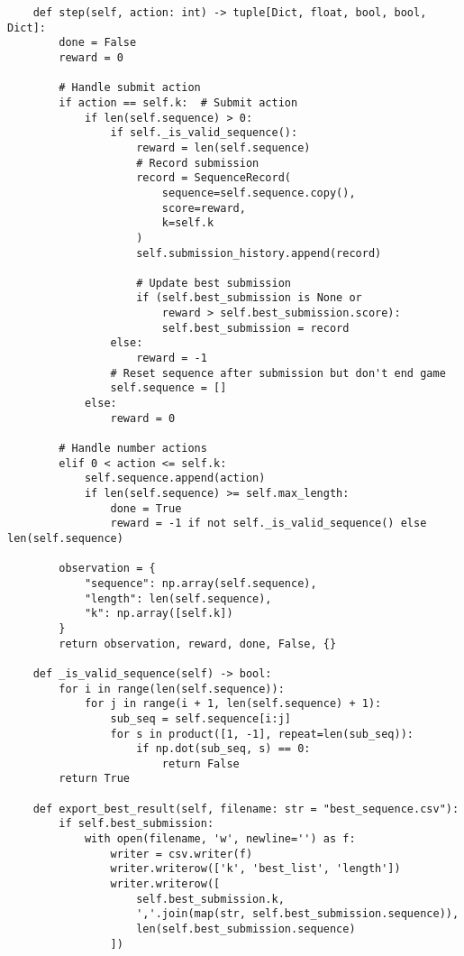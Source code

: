 \begin{lstlisting}
    def step(self, action: int) -> tuple[Dict, float, bool, bool, Dict]:
        done = False
        reward = 0
        
        # Handle submit action
        if action == self.k:  # Submit action
            if len(self.sequence) > 0:
                if self._is_valid_sequence():
                    reward = len(self.sequence)
                    # Record submission
                    record = SequenceRecord(
                        sequence=self.sequence.copy(),
                        score=reward,
                        k=self.k
                    )
                    self.submission_history.append(record)
                    
                    # Update best submission
                    if (self.best_submission is None or 
                        reward > self.best_submission.score):
                        self.best_submission = record
                else:
                    reward = -1
                # Reset sequence after submission but don't end game
                self.sequence = []
            else:
                reward = 0
        
        # Handle number actions
        elif 0 < action <= self.k:
            self.sequence.append(action)
            if len(self.sequence) >= self.max_length:
                done = True
                reward = -1 if not self._is_valid_sequence() else len(self.sequence)

        observation = {
            "sequence": np.array(self.sequence),
            "length": len(self.sequence),
            "k": np.array([self.k])
        }        
        return observation, reward, done, False, {}

    def _is_valid_sequence(self) -> bool:
        for i in range(len(self.sequence)):
            for j in range(i + 1, len(self.sequence) + 1):
                sub_seq = self.sequence[i:j]
                for s in product([1, -1], repeat=len(sub_seq)):
                    if np.dot(sub_seq, s) == 0:
                        return False
        return True
    
    def export_best_result(self, filename: str = "best_sequence.csv"):
        if self.best_submission:
            with open(filename, 'w', newline='') as f:
                writer = csv.writer(f)
                writer.writerow(['k', 'best_list', 'length'])
                writer.writerow([
                    self.best_submission.k,
                    ','.join(map(str, self.best_submission.sequence)),
                    len(self.best_submission.sequence)
                ])


\end{lstlisting}
